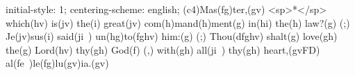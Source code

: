 initial-style: 1;
centering-scheme: english;
(c4)Mas(fg)ter,(gv) <sp>*</sp> which(hv) is(jv) the(i) great(jv) com(h)mand(h)ment(g) in(hi) the(h) law?(g) (;) Je(jv)sus(i) said(ji~) un(hg)to(fghv) him:(g) (;) Thou(dfghv) shalt(g) love(gh) the(g) Lord(hv) thy(gh) God(f) (,) with(gh) all(ji~) thy(gh) heart,(gvFD) al(fe~)le(fg)lu(gv)ia.(gv)
